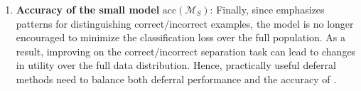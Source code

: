 \begin{enumerate}






    \item \textbf{Accuracy of the small model} $\text{acc}(\mathcal{M}_S)$: Finally, since \loss emphasizes patterns for distinguishing correct/incorrect examples, the model is no longer encouraged to minimize the classification loss over the full population. As a result, improving on the correct/incorrect separation task can lead to changes in utility over the full data distribution. Hence, practically useful deferral methods need to balance both deferral performance and the accuracy of \smallmodel.
\end{enumerate}

